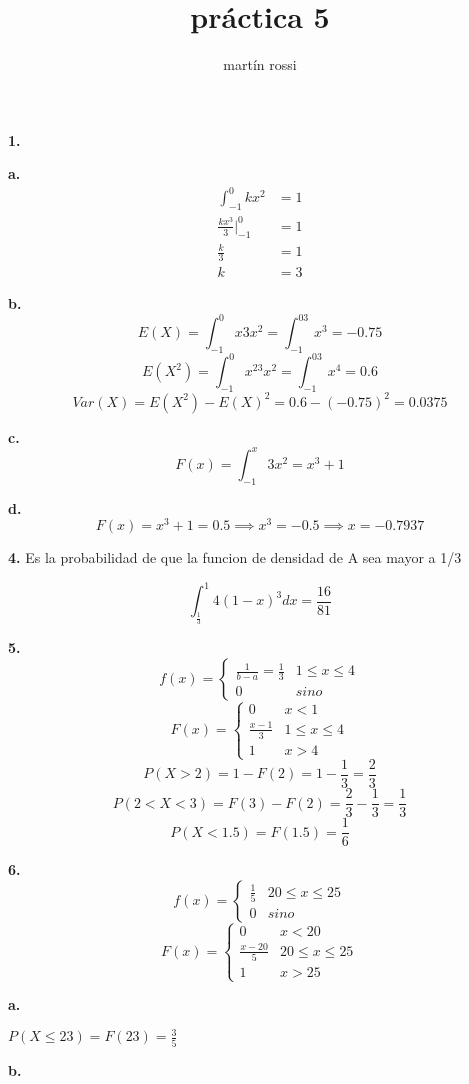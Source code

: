 \documentclass[12pt,fleqn]{article}
\title{práctica 5}
\author{martín rossi}
\date{}
\begin{document}
\maketitle

\textbf{1.}

\textbf{a.}
\begin{align*}
  \int_{-1}^0kx^2&=1\\
  \frac{kx^3}{3}\biggr\rvert^0_{-1}&=1\\
  \frac{k}{3}&=1\\
  k&=3
\end{align*}

\textbf{b.}
\[E(X)=\int_{-1}^0x3x^2=\int_{-1}^03x^3=-0.75\]
\[E(X^2)=\int_{-1}^0x^23x^2=\int_{-1}^03x^4=0.6\]
\[Var(X)=E(X^2)-E(X)^2=0.6-(-0.75)^2=0.0375\]

\textbf{c.}
\[F(x)=\int_{-1}^x3x^2=x^3+1\]

\textbf{d.}
\[F(x)=x^3+1=0.5 \implies x^3=-0.5 \implies x=-0.7937\]

\textbf{4.}
Es la probabilidad de que la funcion de densidad de A sea mayor a 1/3

\[\int_{\frac{1}{3}}^1 4(1-x)^3 dx=\frac{16}{81}\]

\textbf{5.}
\[f(x)=
  \begin{cases}
    \frac{1}{b-a}=\frac{1}{3}&1 \le x \le 4\\
    0&sino
  \end{cases}\]
\[F(x)=
  \begin{cases}
    0&x<1\\
    \frac{x-1}{3}&1 \le x \le 4\\
    1&x>4
  \end{cases}\]
\[P(X>2)=1-F(2)=1-\frac{1}{3}=\frac{2}{3}\]
\[P(2<X<3)=F(3)-F(2)=\frac{2}{3}-\frac{1}{3}=\frac{1}{3}\]
\[P(X<1.5)=F(1.5)=\frac{1}{6}\]

\textbf{6.}
\[f(x)=
  \begin{cases}
    \frac{1}{5}&20 \le x \le 25\\
    0&sino
  \end{cases}\]
\[F(x)=
  \begin{cases}
    0&x<20\\
    \frac{x-20}{5}&20 \le x \le 25\\
    1&x>25
  \end{cases}\]

\textbf{a.}

$P(X \le 23)=F(23)=\frac{3}{5}$

\textbf{b.}
\end{document}
